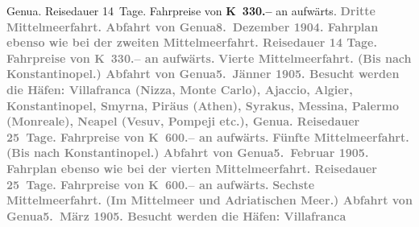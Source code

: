 \begin{ledgroupsized}[t]{13cm}
{{                     Genua. Reisedauer 14 Tage. Fahrpreise von
                     \textbf{K 330.–} an aufwärts.}}\pend
           \pstart
           \textcolor{gray}{\textbf{\textbf{Dritte Mittelmeerfahrt.}
                  Abfahrt von Genua\textbf{8. Dezember 1904}. Fahrplan ebenso wie bei der zweiten Mittelmeerfahrt. Reisedauer 14 Tage. Fahrpreise von \textbf{K 330.–} an aufwärts.}}\pend
           \pstart
           \textcolor{gray}{\textbf{\textbf{Vierte Mittelmeerfahrt.}
                  (Bis nach Konstantinopel.) Abfahrt von Genua\textbf{5. Jänner 1905}. Besucht werden die Häfen: Villafranca
                     (Nizza, Monte Carlo), Ajaccio, Algier, Konstantinopel, Smyrna, Piräus (Athen), Syrakus, Messina, Palermo (Monreale), Neapel (Vesuv, Pompeji etc.), Genua.
                  Reisedauer 25 Tage. Fahrpreise von \textbf{K 600.–} an aufwärts.}}\pend
           \pstart
           \textcolor{gray}{\textbf{\textbf{Fünfte Mittelmeerfahrt.}
                  (Bis nach Konstantinopel.) Abfahrt von Genua\textbf{5. Februar 1905}. Fahrplan ebenso wie bei der vierten Mittelmeerfahrt. Reisedauer 25 Tage. Fahrpreise von \textbf{K 600.–} an aufwärts.}}\pend
           \pstart
           \textcolor{gray}{\textbf{\textbf{Sechste Mittelmeerfahrt.} (Im Mittelmeer und Adriatischen Meer.) Abfahrt von Genua\textbf{5. März 1905}. Besucht werden die Häfen: Villafranca
}}
\end{ledgroupsized}
